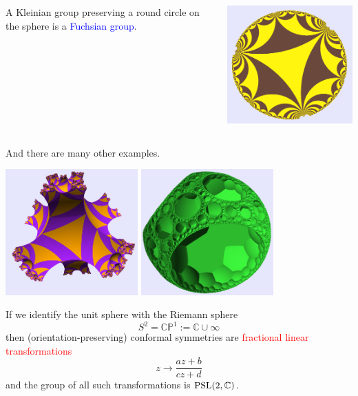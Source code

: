 \documentclass{beamer}
\def\CP{\mathbb{CP}}
\def\C{\mathbb{C}}
\def\PSL{\textnormal{PSL}}
\begin{document}
\frame
{
\begin{columns}[c]
\column{1.1in}
A Kleinian group 
preserving a round circle
on the sphere is a
\textcolor{blue}{Fuchsian group}.
\column{3in}
\begin{center}
\includegraphics[width=3in]{fuchsian.png}
\end{center}
\end{columns}
}
\frame
{
And there are many other examples.
\begin{center}
\includegraphics[height=1.9in]{Schottky.png}\hskip 12pt
\includegraphics[height=1.9in]{7gon_spine.png}
\end{center}
}
\frame
{
If we identify the unit sphere with the \textcolor{dgreen}{Riemann sphere} 
$$S^2 = \CP^1:=\C\cup \infty$$
then (orientation-preserving) conformal symmetries are \textcolor{red}{fractional linear
transformations}
$$z \to \frac {az+b} {cz+d}$$
and the group of all such transformations is $\PSL(2,\C)$.
}
\end{document}
